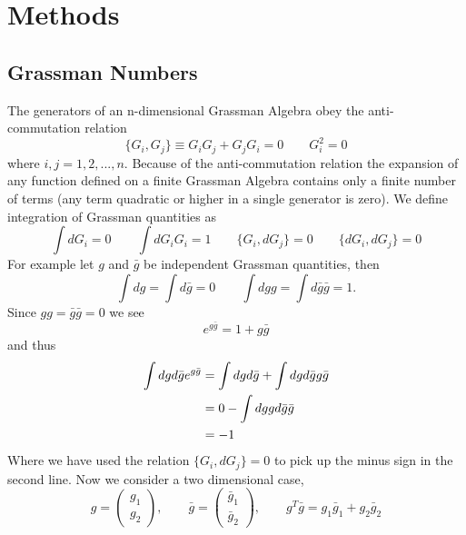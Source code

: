 \chapter{Methods}


 
\section{Grassman Numbers}\label{app::grassman}
The generators of an n-dimensional Grassman Algebra obey the anti-commutation relation 
\begin{equation*}
\{G_i,G_j\} \equiv G_iG_j + G_jG_i = 0 \qquad G_i^2 = 0
\end{equation*}
where $i,j=1,2,...,n$. Because of the anti-commutation relation the expansion of any function defined on a finite Grassman Algebra contains only a finite number of terms (any term quadratic or higher in a single generator is zero). We define integration of Grassman quantities as 
\begin{equation*}
\int dG_i = 0 \qquad \int dG_iG_i = 1 \qquad \{G_i,dG_j\} = 0 \qquad \{dG_i,dG_j\} = 0
\end{equation*}
For example let $g$ and $\bar{g}$ be independent Grassman quantities, then 
\begin{equation*}
\int dg = \int d\bar{g} = 0 \qquad \int dgg = \int d\bar{g}\bar{g} = 1.
\end{equation*}
Since $gg = \bar{g}\bar{g} = 0$ we see 
\begin{equation*}
e^{g\bar{g}} = 1 + g\bar{g}
\end{equation*}
and thus 
\begin{align*}
\int dgd\bar{g}e^{g\bar{g}} &= \int dgd\bar{g} + \int dgd\bar{g} g\bar{g} \notag \\
&= 0 - \int dgg d\bar{g}\bar{g} \notag \\
&= -1
\end{align*}
Where we have used the relation $\{G_i,dG_j\} = 0$ to pick up the minus sign in the second line. Now we consider a two dimensional case, 
\begin{equation*}
g = \left(\begin{array}{c} g_1 \\ g_2 \end{array} \right), \qquad \bar{g} = \left(\begin{array}{c} \bar{g}_1 \\ \bar{g}_2 \end{array}\right), \qquad g^T\bar{g} = g_1\bar{g}_1 + g_2\bar{g}_2
\end{equation*}
